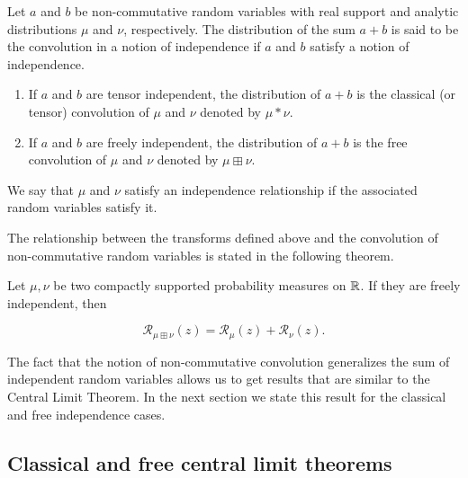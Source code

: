     Let $a$ and $b$ be non-commutative random variables with real support and analytic distributions $\mu$ and $\nu$, respectively. The distribution of the sum $a+b$ is said to be the convolution in a notion of independence if $a$ and $b$ satisfy a notion of independence.

    \begin{enumerate}
        \item If $a$ and $b$ are tensor independent, the distribution of $a+b$ is the classical (or tensor) convolution of $\mu$ and $\nu$ denoted by $\mu*\nu$.
        
        
        
        \item If $a$ and $b$ are freely independent, the distribution of $a+b$ is the free convolution of $\mu$ and $\nu$ denoted by $\mu \boxplus \nu$.
    \end{enumerate}

    We say that $\mu$ and $\nu$ satisfy an independence relationship if the associated random variables satisfy it. 
    
    The relationship between the transforms defined above and the convolution of non-commutative random variables is stated in the following theorem.

    \begin{theorem}
        Let $\mu,\nu$ be two compactly supported probability measures on $\mathbb R$. If they are freely independent, then
            
            \[ \mathcal R_{\mu \boxplus \nu}(z) = \mathcal R_{\mu}(z) + \mathcal R_{\nu} (z).\]
    \end{theorem}

    The fact that the notion of non-commutative convolution generalizes the sum of independent random variables allows us to get results that are similar to the Central Limit Theorem. In the next section we state this result for the classical and free independence cases.

\subsection{Classical and free central limit theorems}

